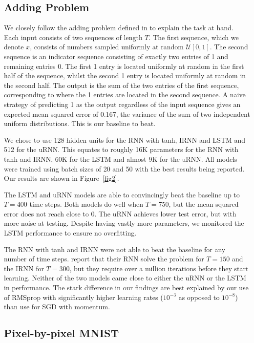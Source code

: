 \documentclass{article} %
\begin{document}
\subsection{Adding Problem}

We closely follow the adding problem defined in \cite{LSTM} to explain the task at hand.
Each input consists of two sequences of length $T$. 
The first sequence, which we denote $x$, consists of numbers sampled uniformly at random 
$\mathcal{U}[0,1]$. 
The second sequence is an indicator sequence consisting of exactly two entries of 1 and remaining entries 0.
The first 1 entry is located uniformly at random in the first half of the sequence, whilst the second 1
entry is located uniformly at random in the second half.
The output is the sum of the two entries of the first sequence, corresponding to where the 1 entries are
located in the second sequence. A naive strategy of predicting 1 as the output regardless of the input sequence gives an expected mean
squared error of $0.167$, the variance of the sum of two independent uniform distributions.
This is our baseline to beat.

We chose to use 128 hidden units for the RNN with tanh, IRNN and LSTM and 512 for the uRNN.
This equates to roughly 16K parameters for the RNN with tanh and IRNN, 60K for the LSTM and almost 9K for
the uRNN. All models were trained using batch sizes of 20 and 50 with the best results being reported.
Our results are shown in Figure~\ref{fig2}.

The LSTM and uRNN models are able to convincingly beat the baseline up to $T=400$ time steps.
Both models do well when $T=750$, but the mean squared error does not reach close to $0$.
The uRNN achieves lower test error, but with more noise at testing. Despite having vastly more parameters,
we monitored the LSTM performance to ensure no overfitting.

The RNN with tanh and IRNN were not able to beat the baseline for any number of time steps. 
\cite{Quoc2015} report that their RNN solve the problem for $T=150$ and the IRNN for $T=300$,
but they require over a million iterations before they start learning. 
Neither of the two models came close to either the uRNN or the LSTM in performance.
The stark difference in our findings are best explained by our use of RMSprop with significantly higher 
learning rates ($10^{-3}$ as opposed to $10^{-8}$) than \cite{Quoc2015} use for SGD with momentum.

\vspace{-0.25mm}
\subsection{Pixel-by-pixel MNIST}
\end{document}
